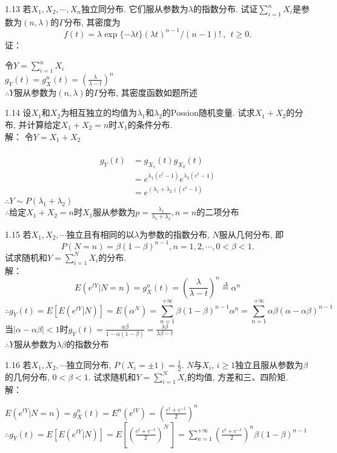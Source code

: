 1.13 若$X_1, X_2,\cdots, X_n$独立同分布. 它们服从参数为$\lambda$的指数分布. 试证$\sum\limits^n_{i=1}X_i$是参数为$(n, \lambda)$的$\Gamma$分布, 其密度为
	\[
	f(t) = \lambda \exp\{-\lambda t\}(\lambda t)^{n-1}/(n-1)!~,~~t \geqslant 0.
	\]
证：
	\begin{flushleft}
	令$Y = \sum\limits^n_{i=1}X_i$\\
	$g_Y(t) = g^n_X(t) = \left(\frac{\lambda}{\lambda - t}\right)^n$\\
	$\therefore Y$服从参数为$(n, \lambda)$的$\Gamma$分布, 其密度函数如题所述\\
	\end{flushleft}


1.14 设$X_1$和$X_2$为相互独立的均值为${\lambda}_1$和${\lambda}_2$的Possion随机变量. 试求$X_1+X_2$的分布, 并计算给定$X_1+X_2 = n$时$X_1$的条件分布.\\
解：
	令$Y = X_1+X_2$\\\
	\begin{align*}
	g_Y(t) & = g_{X_1}(t)g_{X_2}(t)\\
			& = e^{{\lambda}_1(e^t-1)}e^{{\lambda}_2(e^t-1)}\\
			& = e^{({\lambda}_1 + {\lambda}_2)(e^t-1)}
	\end{align*}
	$\therefore Y \sim P({\lambda}_1+{\lambda}_2)$\\
	$\therefore $给定$X_1+X_2 = n$时$X_1$服从参数为$p = \frac{{\lambda}_1}{{\lambda}_1 + {\lambda}_2}, n = n$的二项分布


1.15 若$X_1, X_2,\cdots $独立且有相同的以$\lambda$为参数的指数分布, $N$服从几何分布, 即
	\[
	P(N = n) = \beta(1-\beta)^{n-1}, n = 1,2,\cdots, 0<\beta<1.
	\]
试求随机和$Y = \sum\limits^N_{i=1}X_i$的分布.\\
解：
	\[
	E(e^{tY} | N = n) = g^n_X (t) = \left(\frac{\lambda}{\lambda - t}\right)^n \overset{\Delta}{=} {\alpha}^n
	\]
	\[
	\therefore g_Y(t) = E[E(e^{tY}|N)] = E({\alpha}^N) = \sum^{+\infty}_{n=1}\beta(1-\beta)^{n-1}{\alpha}^n = \sum^{+\infty}_{n=1}\alpha\beta(\alpha-\alpha\beta)^{n-1}
	\]
	当$|\alpha -\alpha\beta|<1$时$g_Y(t)=\frac{\alpha\beta}{1-\alpha(1-\beta)} = \frac{\lambda\beta}{\lambda\beta - t}$\\
	$\therefore Y$服从参数为$\lambda\beta$的指数分布


1.16 若$X_1, X_2, \cdots$独立同分布, $P(X_i = \pm 1) = \frac{1}{2}$. $N$与$X_i$, $i \geqslant 1$独立且服从参数为$\beta$的几何分布, $0 < \beta < 1$. 试求随机和$Y = \sum\limits^N_{i=1} X_i$的均值, 方差和三、四阶矩.\\
解：
	\begin{center}
	$E(e^{tY} | N = n) = g^n_X (t) = E^n(e^{tY}) = {\left(\frac{e^t + e^{-t}}{2}\right)}^n$\\
	$\therefore g_Y(t) = E \left[ E(e^{tY} | N)\right] = E \left[ {\left(\frac{e^t + e^{-t}}{2}\right)}^N\,\right] = \sum\limits^{+\infty}_{n=1}{\left(\frac{e^t + e^{-t}}{2}\right)}^n \beta (1 - \beta)^{n - 1}$
	\end{center}

